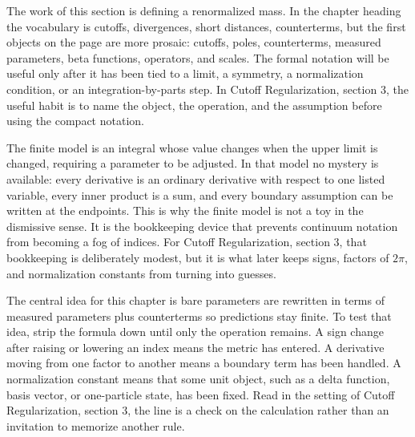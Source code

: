 











The work of this section is defining a renormalized mass.  In the chapter heading the vocabulary is cutoffs, divergences, short distances, counterterms, but the first objects on the page are more prosaic: cutoffs, poles, counterterms, measured parameters, beta functions, operators, and scales.  The formal notation will be useful only after it has been tied to a limit, a symmetry, a normalization condition, or an integration-by-parts step.  In Cutoff Regularization, section 3, the useful habit is to name the object, the operation, and the assumption before using the compact notation.

The finite model is an integral whose value changes when the upper limit is changed, requiring a parameter to be adjusted.  In that model no mystery is available: every derivative is an ordinary derivative with respect to one listed variable, every inner product is a sum, and every boundary assumption can be written at the endpoints.  This is why the finite model is not a toy in the dismissive sense.  It is the bookkeeping device that prevents continuum notation from becoming a fog of indices.  For Cutoff Regularization, section 3, that bookkeeping is deliberately modest, but it is what later keeps signs, factors of \(2\pi\), and normalization constants from turning into guesses.

The central idea for this chapter is bare parameters are rewritten in terms of measured parameters plus counterterms so predictions stay finite.  To test that idea, strip the formula down until only the operation remains.  A sign change after raising or lowering an index means the metric has entered.  A derivative moving from one factor to another means a boundary term has been handled.  A normalization constant means that some unit object, such as a delta function, basis vector, or one-particle state, has been fixed.  Read in the setting of Cutoff Regularization, section 3, the line is a check on the calculation rather than an invitation to memorize another rule.

